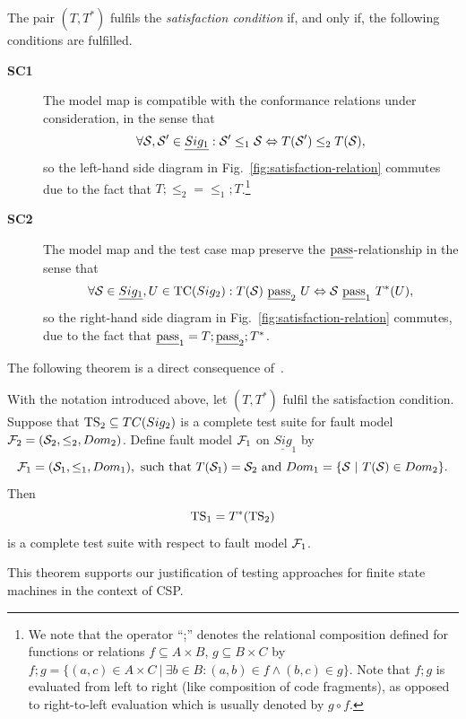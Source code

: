 The pair $(T,T^*)$ fulfils the \emph{satisfaction condition} if, and only if,
the following conditions are fulfilled.
%
\begin{description}
  \item[\bf SC1] The model map is compatible with the conformance relations
      under consideration, in the sense that
  $$
  \forall {\cal S},{\cal S}'\in \underline{Sig_1}: {\cal S}' \le_1 {\cal S} \Leftrightarrow
  T({\cal S}') \le_2 T({\cal S}),
  $$
  so   the left-hand side diagram   in Fig.~\ref{fig:satisfaction-relation}
  commutes due to the fact that $T;\le_2 = \le_1;T$.\footnote{We note that
  the operator ``;'' denotes the relational composition defined for
  functions or relations $f\subseteq A\times B$, $g\subseteq B\times C$ by
  $f;g = \{(a,c)\in A\times C~|~\exists b\in B: (a,b)\in f \wedge (b,c)\in
  g\}$. Note that $f;g$ is evaluated from left to right (like composition
  of code fragments), as opposed to right-to-left evaluation which is
  usually denoted by $g\circ f$.}

  \item[\bf SC2] The model map and the test case map preserve the
      $\underline{\text{pass}}$-relationship in the sense that
  $$
  \forall {\cal S}\in \underline{Sig_1}, U \in\tc(Sig_2): T({\cal S})\ \pass_2\ U \Leftrightarrow {\cal S}\ \pass_1\ T^*(U),
  $$
  so the right-hand side diagram   in Fig.~\ref{fig:satisfaction-relation}
  commutes, due to the fact that $\underline{\text{pass}}_1 = T;\underline{\text{pass}}_2;T^*$.
\end{description}
The following theorem is a direct consequence
of~\cite[Theorem~2.1]{Huang2017}.
%
\begin{theorem}
  \label{th:theorytranslation}
  With the notation introduced above, let  $(T,T^*)$ fulfil the satisfaction condition.
  Suppose that ${\text{TS}}_2 \subseteq TC(Sig_2)$ is a complete test suite
  for fault model ${\cal F}_2 = ({\cal S}_2,\le_2,Dom_2)$. Define fault model ${\cal F}_1$ on
  $\underline{Sig}_1$ by
  $$
  {\cal F}_1 = ({\cal S}_1,\le_1,Dom_1),\ \text{such that}\
  T({\cal S}_1)  =  {\cal S}_2\ \text{and}\
  Dom_1  =  \{ {\cal S}~|~T({\cal S})\in Dom_2 \}.
  $$
  Then
  $$
  {\text{TS}}_1 = T^*({\text{TS}}_2)
  $$
  is a complete test suite with respect to fault model ${\cal F}_1$.
  \xbox
\end{theorem}
%
This theorem supports our justification of testing approaches for finite
state machines in the context of CSP.

